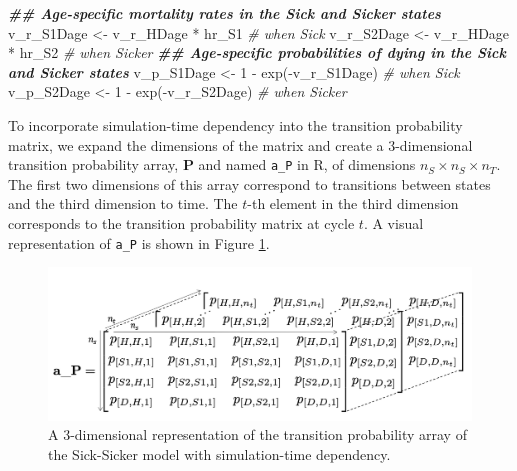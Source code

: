 \documentclass[
]{article}
\newenvironment{Shaded}{\begin{snugshade}}{\end{snugshade}}
\newcommand{\CommentTok}[1]{\textcolor[rgb]{0.56,0.35,0.01}{\textit{#1}}}
\newcommand{\DecValTok}[1]{\textcolor[rgb]{0.00,0.00,0.81}{#1}}
\newcommand{\DocumentationTok}[1]{\textcolor[rgb]{0.56,0.35,0.01}{\textbf{\textit{#1}}}}
\newcommand{\FunctionTok}[1]{\textcolor[rgb]{0.00,0.00,0.00}{#1}}
\newcommand{\NormalTok}[1]{#1}
\newcommand{\OtherTok}[1]{\textcolor[rgb]{0.56,0.35,0.01}{#1}}
\newcommand{\SpecialCharTok}[1]{\textcolor[rgb]{0.00,0.00,0.00}{#1}}
\begin{document}
\begin{Shaded}
\begin{Highlighting}[]
\DocumentationTok{\#\# Age{-}specific mortality rates in the Sick and Sicker states}
\NormalTok{v\_r\_S1Dage }\OtherTok{\textless{}{-}}\NormalTok{ v\_r\_HDage }\SpecialCharTok{*}\NormalTok{ hr\_S1 }\CommentTok{\# when Sick}
\NormalTok{v\_r\_S2Dage }\OtherTok{\textless{}{-}}\NormalTok{ v\_r\_HDage }\SpecialCharTok{*}\NormalTok{ hr\_S2 }\CommentTok{\# when Sicker}
\DocumentationTok{\#\# Age{-}specific probabilities of dying in the Sick and Sicker states}
\NormalTok{v\_p\_S1Dage }\OtherTok{\textless{}{-}} \DecValTok{1} \SpecialCharTok{{-}} \FunctionTok{exp}\NormalTok{(}\SpecialCharTok{{-}}\NormalTok{v\_r\_S1Dage) }\CommentTok{\# when Sick}
\NormalTok{v\_p\_S2Dage }\OtherTok{\textless{}{-}} \DecValTok{1} \SpecialCharTok{{-}} \FunctionTok{exp}\NormalTok{(}\SpecialCharTok{{-}}\NormalTok{v\_r\_S2Dage) }\CommentTok{\# when Sicker}
\end{Highlighting}
\end{Shaded}

To incorporate simulation-time dependency into the transition probability matrix, we expand the dimensions of the matrix and create a 3-dimensional transition probability array, \(\mathbf{P}\) and named \texttt{a\_P} in R, of dimensions \(n_S \times n_S \times n_T\). The first two dimensions of this array correspond to transitions between states and the third dimension to time. The \(t\)-th element in the third dimension corresponds to the transition probability matrix at cycle \(t\). A visual representation of \texttt{a\_P} is shown in Figure \ref{fig:Array-Time-Dependent}.

\begin{figure}[H]

{\centering \includegraphics[width=1\linewidth]{figs/3D-state-transition-array-sick-sicker-without-tunnels} 

}

\caption{A 3-dimensional representation of the transition probability array of the Sick-Sicker model with simulation-time dependency.}\label{fig:Array-Time-Dependent}
\end{figure}
\end{document}
